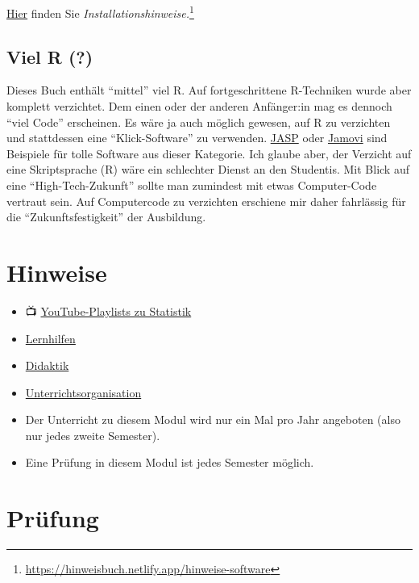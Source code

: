\documentclass[
  a4paper,
  DIV=11]{scrreprt}
\begin{document}
\href{https://hinweisbuch.netlify.app/hinweise-software}{Hier} finden
Sie \emph{Installationshinweise.}\footnote{\url{https://hinweisbuch.netlify.app/hinweise-software}}

\subsection{Viel R (?)}\label{viel-r}

Dieses Buch enthält ``mittel'' viel R. Auf fortgeschrittene R-Techniken
wurde aber komplett verzichtet. Dem einen oder der anderen Anfänger:in
mag es dennoch ``viel Code'' erscheinen. Es wäre ja auch möglich
gewesen, auf R zu verzichten und stattdessen eine ``Klick-Software'' zu
verwenden. \href{https://jasp-stats.org/}{JASP} oder
\href{https://www.jamovi.org/}{Jamovi} sind Beispiele für tolle Software
aus dieser Kategorie. Ich glaube aber, der Verzicht auf eine
Skriptsprache (R) wäre ein schlechter Dienst an den Studentis. Mit Blick
auf eine ``High-Tech-Zukunft'' sollte man zumindest mit etwas
Computer-Code vertraut sein. Auf Computercode zu verzichten erschiene
mir daher fahrlässig für die ``Zukunftsfestigkeit'' der Ausbildung.

\section{Hinweise}\label{hinweise}

\begin{itemize}
\item
  📺
  \href{https://www.youtube.com/channel/UCkvdtj8maE7g-SOCh4aDB9g}{YouTube-Playlists
  zu Statistik}
\item
  \href{https://hinweisbuch.netlify.app/hinweise-lernhilfen-frame}{Lernhilfen}
\item
  \href{https://hinweisbuch.netlify.app/hinweise-didaktik-frame}{Didaktik}
\item
  \href{https://hinweisbuch.netlify.app/hinweise-unterricht-frame}{Unterrichtsorganisation}
\item
  Der Unterricht zu diesem Modul wird nur ein Mal pro Jahr angeboten
  (also nur jedes zweite Semester).
\item
  Eine Prüfung in diesem Modul ist jedes Semester möglich.
\end{itemize}

\section{Prüfung}\label{pruxfcfung}
\end{document}
